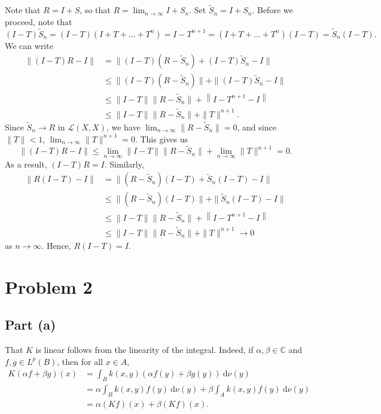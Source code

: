 \documentclass[11pt]{article}
\theoremstyle{thmstyle}
\theoremstyle{defstyle}
\newcommand{\bbC}{\mathbb{C}}
\newcommand{\wt}[1]{\widetilde{#1}}
\renewcommand{\le}{\leqslant}
\newcommand{\calL}{\mathcal{L}}
\begin{document}
Note that $R = I + S$, so that $R = \displaystyle\lim_{n\to\infty} I + S_n$. Set $\wt S_n = I + S_n$. Before we proceed, note that 
\begin{equation*}
    (I - T)\wt S_n = (I - T)\left(I + T + \dots + T^n\right) = I - T^{n + 1} = \left(I + T + \dots + T^n\right)(I - T) = \wt S_n(I - T).
\end{equation*}
We can write
\begin{align*}
    \|(I - T)R - I\| &= \|(I - T)(R - \wt S_n) + (I - T)\wt S_n - I\|\\
    &\le \|(I - T)(R - \wt S_n)\| + \|(I - T)\wt S_n - I\|\\
    &\le\|I - T\|\|R - \wt S_n\| + \left\|I - T^{n + 1} - I\right\|\\
    &\le \|I - T\|\|R - \wt S_n\| + \|T\|^{n + 1}.
\end{align*}
Since $\wt S_n\to R$ in $\calL(X, X)$, we have $\displaystyle\lim_{n\to\infty} \|R - \wt S_n\| = 0$, and since $\|T\| < 1$, $\displaystyle\lim_{n\to\infty}\|T\|^{n + 1} = 0$. This gives us
\begin{equation*}
    \|(I - T)R - I\|\le \lim_{n\to\infty}\|I - T\|\|R - \wt S_n\| + \lim_{n\to\infty}\|T\|^{n + 1} = 0.
\end{equation*}
As a result, $(I - T)R = I$. Similarly, 
\begin{align*}
    \|R(I - T) - I\| &= \|(R - \wt S_n) (I - T) + \wt S_n(I - T) - I\|\\
    &\le \|(R - \wt S_n)(I - T)\| + \|\wt S_n(I - T) - I\|\\
    &\le\|I - T\|\|R - \wt S_n\| + \left\|I - T^{n + 1} - I\right\|\\
    &\le \|I - T\|\|R - \wt S_n\| + \|T\|^{n + 1}\to 0
\end{align*}
as $n\to\infty$. Hence, $R(I - T) = I$.

\section{Problem 2}

\subsection{Part (a)}

That $K$ is linear follows from the linearity of the integral. Indeed, if $\alpha,\beta\in\bbC$ and $f, g\in L^p(B)$, then for all $x\in A$, 
\begin{align*}
    K(\alpha f + \beta g)(x) &= \int_B k(x, y)\left(\alpha f(y) + \beta g(y)\right)~\mathrm d\nu(y)\\ &= \alpha\int_B k(x, y) f(y)~\mathrm d\nu(y) + \beta\int_A k(x, y)f(y)~\mathrm d\nu(y)\\ &= \alpha (Kf)(x) + \beta (Kf)(x).
\end{align*}
\end{document}
